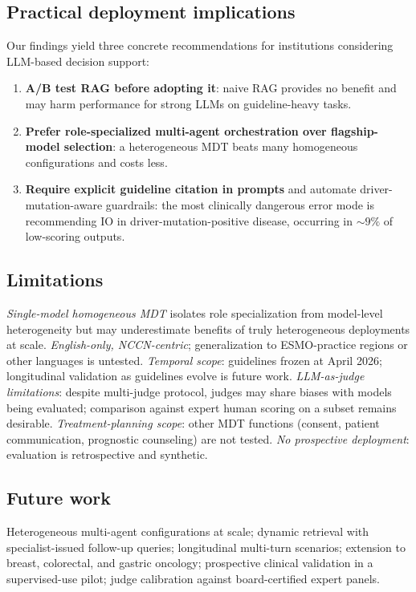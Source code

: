 \documentclass[final, 11pt, 3p]{elsarticle}
\begin{document}
\subsection{Practical deployment implications}
Our findings yield three concrete recommendations for institutions
considering LLM-based decision support:

\begin{enumerate}
\item \textbf{A/B test RAG before adopting it}: naive RAG provides no
  benefit and may harm performance for strong LLMs on guideline-heavy
  tasks.
\item \textbf{Prefer role-specialized multi-agent orchestration over
  flagship-model selection}: a heterogeneous MDT beats many
  homogeneous configurations and costs less.
\item \textbf{Require explicit guideline citation in prompts} and
  automate driver-mutation-aware guardrails: the most clinically
  dangerous error mode is recommending IO in driver-mutation-positive
  disease, occurring in $\sim9\%$ of low-scoring outputs.
\end{enumerate}

\subsection{Limitations}
\emph{Single-model homogeneous MDT} isolates role specialization from
model-level heterogeneity but may underestimate benefits of truly
heterogeneous deployments at scale. \emph{English-only, NCCN-centric};
generalization to ESMO-practice regions or other languages is untested.
\emph{Temporal scope}: guidelines frozen at April 2026; longitudinal
validation as guidelines evolve is future work. \emph{LLM-as-judge
limitations}: despite multi-judge protocol, judges may share biases
with models being evaluated; comparison against expert human scoring on
a subset remains desirable. \emph{Treatment-planning scope}: other MDT
functions (consent, patient communication, prognostic counseling) are
not tested. \emph{No prospective deployment}: evaluation is
retrospective and synthetic.

\subsection{Future work}
Heterogeneous multi-agent configurations at scale; dynamic retrieval
with specialist-issued follow-up queries; longitudinal multi-turn
scenarios; extension to breast, colorectal, and gastric oncology;
prospective clinical validation in a supervised-use pilot; judge
calibration against board-certified expert panels.
\end{document}

